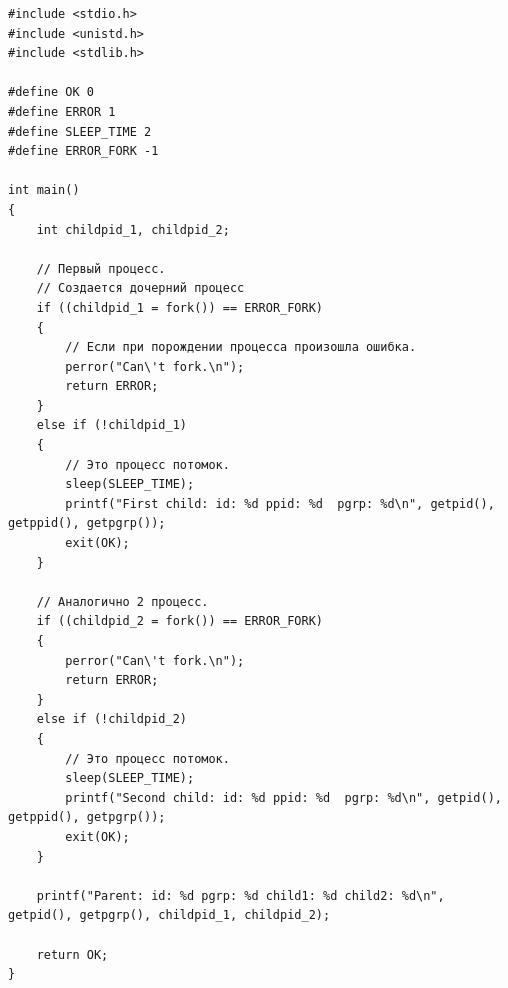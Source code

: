 


\begin{lstlisting}[label=some-code,caption=Программа 1.]
#include <stdio.h>
#include <unistd.h>
#include <stdlib.h>

#define OK 0
#define ERROR 1
#define SLEEP_TIME 2
#define ERROR_FORK -1

int main()
{
	int childpid_1, childpid_2;

	// Первый процесс.
	// Создается дочерний процесс
	if ((childpid_1 = fork()) == ERROR_FORK)
	{
		// Если при порождении процесса произошла ошибка.
		perror("Can\'t fork.\n");
		return ERROR;
	}
	else if (!childpid_1)
	{
		// Это процесс потомок.
		sleep(SLEEP_TIME);
		printf("First child: id: %d ppid: %d  pgrp: %d\n", getpid(), getppid(), getpgrp());
		exit(OK);
	}

	// Аналогично 2 процесс.
	if ((childpid_2 = fork()) == ERROR_FORK)
	{
		perror("Can\'t fork.\n");
		return ERROR;
	}
	else if (!childpid_2)
	{
		// Это процесс потомок.
		sleep(SLEEP_TIME);
		printf("Second child: id: %d ppid: %d  pgrp: %d\n", getpid(), getppid(), getpgrp());
		exit(OK);
	}

	printf("Parent: id: %d pgrp: %d child1: %d child2: %d\n", getpid(), getpgrp(), childpid_1, childpid_2);

	return OK;
}
\end{lstlisting}

\begin{figure}[ht!]
\end{figure}

\begin{figure}[ht!]
\end{figure}

\begin{figure}[ht!]
\end{figure}

